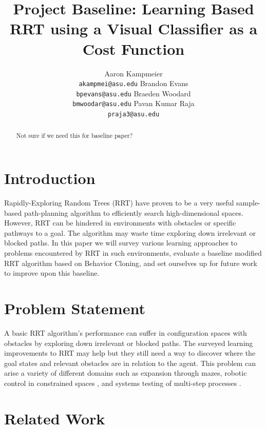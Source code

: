 \documentclass{article}
\title{Project Baseline: 
Learning Based RRT using a Visual Classifier as a Cost Function
}
\author{Aaron Kampmeier \\ \texttt{akampmei@asu.edu} \And Brandon Evans \\ \texttt{bpevans@asu.edu} \And Braeden Woodard \\ \texttt{bmwoodar@asu.edu} \And Pavan Kumar Raja \\ \texttt{praja3@asu.edu}}
\begin{document}


\maketitle


\begin{abstract}
  Not sure if we need this for baseline paper?
\end{abstract}


\section{Introduction}

Rapidly-Exploring Random Trees (RRT) \cite{LaValleStevenM.2001RKP} have proven to be a very useful sample-based path-planning algorithm to efficiently search high-dimensional spaces. However, RRT can be hindered in environments with obstacles or specific pathways to a goal. The algorithm may waste time exploring down irrelevant or blocked paths. In this paper we will survey various learning approaches to problems encountered by RRT in such environments, evaluate a baseline modified RRT algorithm based on Behavior Cloning, and set ourselves up for future work to improve upon this baseline. 

\section{Problem Statement}

A basic RRT algorithm's performance can suffer in configuration spaces with obstacles by exploring down irrelevant or blocked paths. The surveyed learning improvements to RRT may help but they still need a way to discover where the goal states and relevant obstacles are in relation to the agent. This problem can arise a variety of different domains such as expansion through mazes, robotic control in constrained spaces \cite{9164659}, and systems testing of multi-step processes \cite{ZuoMax2022EEvF}.


\section{Related Work}
\end{document}
